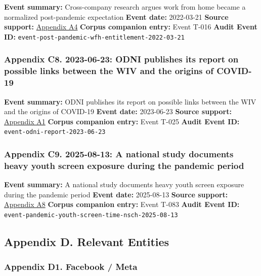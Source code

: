 \documentclass[
  american,
  11pt,
  letterpaper,
]{article}
\begin{document}
\textbf{Event summary:} Cross-company research argues work from home
became a normalized post-pandemic expectation \textbf{Event date:}
2022-03-21 \textbf{Source support:}
\hyperref[appendix-a4-work-from-home-is-here-to-stay-call-for-flexibility-in-post-pandemic-work-policies]{Appendix
A4} \textbf{Corpus companion entry:} Event T-016 \textbf{Audit Event
ID:} \texttt{event-post-pandemic-wfh-entitlement-2022-03-21}

\subsubsection{Appendix C8. 2023-06-23: ODNI publishes its report on
possible links between the WIV and the origins of
COVID-19}\label{appendix-c8-2023-06-23-odni-publishes-its-report-on-possible-links-between-the-wiv-and-the-origins-of-covid-19}

\textbf{Event summary:} ODNI publishes its report on possible links
between the WIV and the origins of COVID-19 \textbf{Event date:}
2023-06-23 \textbf{Source support:}
\hyperref[appendix-a1-report-on-potential-links-between-the-wuhan-institute-of-virology-and-the-origins-of-covid-19]{Appendix
A1} \textbf{Corpus companion entry:} Event T-025 \textbf{Audit Event
ID:} \texttt{event-odni-report-2023-06-23}

\subsubsection{Appendix C9. 2025-08-13: A national study documents heavy
youth screen exposure during the pandemic
period}\label{appendix-c9-2025-08-13-a-national-study-documents-heavy-youth-screen-exposure-during-the-pandemic-period}

\textbf{Event summary:} A national study documents heavy youth screen
exposure during the pandemic period \textbf{Event date:} 2025-08-13
\textbf{Source support:}
\hyperref[appendix-a8-excessive-screen-time-is-associated-with-mental-health-problems-and-adhd-in-us-children-and-adolescents-physical-activity-and-sleep-as-parallel-mediators]{Appendix
A8} \textbf{Corpus companion entry:} Event T-083 \textbf{Audit Event
ID:} \texttt{event-pandemic-youth-screen-time-nsch-2025-08-13}

\subsection{Appendix D. Relevant
Entities}\label{appendix-d.-relevant-entities}

\subsubsection{Appendix D1. Facebook /
Meta}\label{appendix-d1-facebook-meta}
\end{document}
